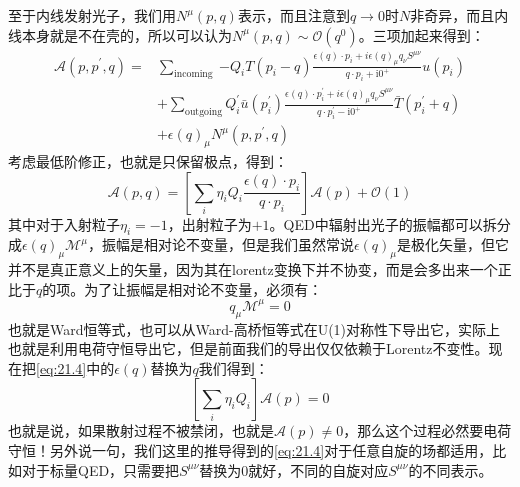 至于内线发射光子，我们用$N^\mu(p,q)$表示，而且注意到$q\to0$时$N$非奇异，而且内线本身就是不在壳的，所以可以认为$N^\mu(p,q)\sim\mathcal{O}(q^0)$。三项加起来得到：
\begin{equation}\label{eq:21.3}
	\begin{aligned}
		\mathcal{A}(p,p^{\prime},q) =&\sum_\text{incoming }{ - Q _ i T ( p _ i - q )}\frac{\epsilon(q)\cdot p_i+i\epsilon(q)_{\mu}q_\nu S^{\mu\nu}}{q\cdot p_i+\mathrm{i}0^+}u(p_i)  \\
		&+\sum_{\mathrm{outgoing}}Q_{i}^{\prime}\bar{u}(p_{i}^{\prime})\frac{\epsilon(q)\cdot p_{i}^{\prime}+i\epsilon(q)_{\mu}q_{\nu}{S}^{\mu\nu}}{q\cdot p_{i}^{\prime}-\mathrm{i}0^+}\bar{T}(p_{i}^{\prime}+q)\\
		&+\epsilon(q)_{\mu}N^{\mu}(p,p^{\prime},q)
	\end{aligned}
\end{equation}
考虑最低阶修正，也就是只保留极点，得到：
\begin{equation}\label{eq:21.4}
	\boxed{
	\mathcal{A}(p,q)=\left[\sum_{i}\eta_iQ_{i}\frac{\epsilon(q)\cdot p_{i}}{q\cdot p_{i}}\right]\mathcal{A}(p)}+\mathcal{O}(1)
\end{equation}
其中对于入射粒子$\eta_i=-1$，出射粒子为$+1$。QED中辐射出光子的振幅都可以拆分成$\epsilon(q)_\mu \mathcal{M}^\mu$，振幅是相对论不变量，但是我们虽然常说$\epsilon(q)_\mu$是极化矢量，但它并不是真正意义上的矢量，因为其在lorentz变换下并不协变，而是会多出来一个正比于$q$的项\cite{Weinberg}。为了让振幅是相对论不变量，必须有：
\begin{equation}\label{eq:21.5}
	\boxed{
	q_\mu\mathcal{M}^\mu=0}
\end{equation}
也就是Ward恒等式，也可以从Ward-高桥恒等式在U(1)对称性下导出它，实际上也就是利用电荷守恒导出它，但是前面我们的导出仅仅依赖于Lorentz不变性。现在把\ref{eq:21.4}中的$\epsilon(q)$替换为$q$我们得到：
\begin{equation}\label{eq:21.6}
	\left[\sum_i\eta_i Q_i\right]\mathcal{A}(p)=0
\end{equation}
也就是说，如果散射过程不被禁闭，也就是$\mathcal{A}(p)\neq 0$，那么这个过程必然要电荷守恒！另外说一句，我们这里的推导得到的\ref{eq:21.4}对于任意自旋的场都适用，比如对于标量QED，只需要把$S^{\mu\nu}$替换为0就好，不同的自旋对应$S^{\mu\nu}$的不同表示。

